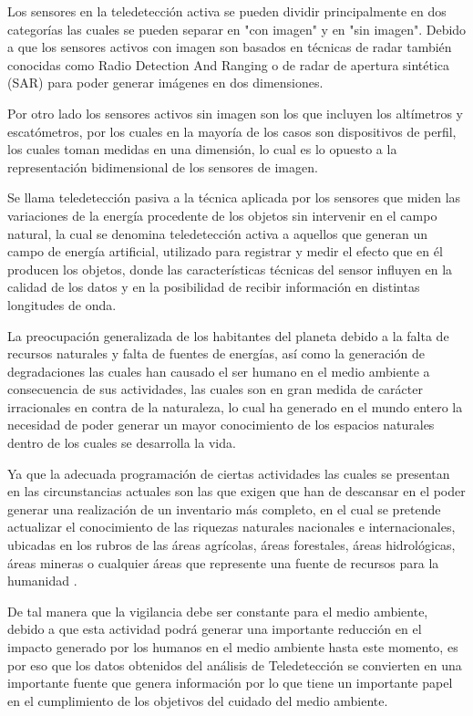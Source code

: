 Los sensores en la teledetección activa se pueden dividir principalmente en dos categorías las cuales se pueden separar en "con imagen" y en "sin imagen". Debido a que los sensores activos con imagen son basados en técnicas de radar también conocidas como Radio Detection And Ranging o de radar de apertura sintética (SAR) para poder generar imágenes en dos dimensiones. 

Por otro lado los sensores activos sin imagen son los que incluyen los altímetros y escatómetros, por los cuales en la mayoría de los casos son dispositivos de perfil, los cuales toman medidas en una dimensión, lo cual es lo opuesto a la representación bidimensional de los sensores de imagen.

Se llama teledetección pasiva a la técnica aplicada por los sensores que miden las variaciones de la energía procedente de los objetos sin intervenir en el campo natural, la cual se denomina teledetección activa a aquellos que generan un campo de energía artificial, utilizado para registrar y medir el efecto que en él producen los objetos, donde las características técnicas del sensor influyen en la calidad de los datos y  en la posibilidad de recibir información en distintas longitudes de onda.

La preocupación generalizada de los habitantes del planeta debido a la falta de recursos naturales y falta de fuentes de energías, así como la generación de degradaciones las cuales han causado el ser humano en el medio ambiente a consecuencia de sus actividades, las cuales son en gran medida de carácter irracionales en contra de la naturaleza, lo cual ha generado en el mundo entero la necesidad de poder generar un mayor conocimiento de los espacios naturales dentro de los cuales se desarrolla la vida. 

Ya que la adecuada programación de ciertas actividades las cuales se presentan en las circunstancias actuales son las que exigen que han de descansar en el poder generar una realización de un inventario más completo, en el cual se pretende actualizar el conocimiento de las riquezas naturales nacionales e internacionales, ubicadas en los rubros de las áreas agrícolas, áreas forestales, áreas hidrológicas, áreas mineras o cualquier áreas que represente una fuente de recursos para la humanidad \cite{Romero2007}.

De tal manera que la vigilancia debe ser constante para el medio ambiente, debido a que esta actividad podrá generar una importante reducción en el impacto generado por los humanos en el medio ambiente hasta este momento, es por eso que los datos obtenidos del análisis de Teledetección se convierten en una importante fuente que genera información por lo que tiene un importante papel en el cumplimiento de los objetivos del cuidado del medio ambiente.

